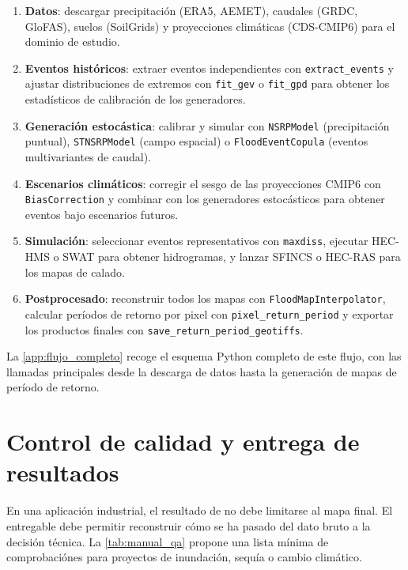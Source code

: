 \begin{enumerate}
  \item \textbf{Datos}: descargar precipitación (ERA5, AEMET), caudales (GRDC, GloFAS), suelos (SoilGrids) y proyecciones climáticas (CDS-CMIP6) para el dominio de estudio.
  \item \textbf{Eventos históricos}: extraer eventos independientes con \texttt{extract\_events} y ajustar distribuciones de extremos con \texttt{fit\_gev} o \texttt{fit\_gpd} para obtener los estadísticos de calibración de los generadores.
  \item \textbf{Generación estocástica}: calibrar y simular con \texttt{NSRPModel} (precipitación puntual), \texttt{STNSRPModel} (campo espacial) o \texttt{FloodEventCopula} (eventos multivariantes de caudal).
  \item \textbf{Escenarios climáticos}: corregir el sesgo de las proyecciones CMIP6 con \texttt{BiasCorrection} y combinar con los generadores estocásticos para obtener eventos bajo escenarios futuros.
  \item \textbf{Simulación}: seleccionar eventos representativos con \texttt{maxdiss}, ejecutar HEC-HMS o SWAT para obtener hidrogramas, y lanzar SFINCS o HEC-RAS para los mapas de calado.
  \item \textbf{Postprocesado}: reconstruir todos los mapas con \texttt{FloodMapInterpolator}, calcular períodos de retorno por pixel con \texttt{pixel\_return\_period} y exportar los productos finales con \texttt{save\_return\_period\_geotiffs}.
\end{enumerate}


La \cref{app:flujo_completo} recoge el esquema Python completo de este flujo, con las llamadas principales desde la descarga de datos hasta la generación de mapas de período de retorno.

\section{Control de calidad y entrega de resultados}

En una aplicación industrial, el resultado de \hydra no debe limitarse al mapa final. El entregable debe permitir reconstruir cómo se ha pasado del dato bruto a la decisión técnica. La \cref{tab:manual_qa} propone una lista mínima de comprobaciónes para proyectos de inundación, sequía o cambio climático.

